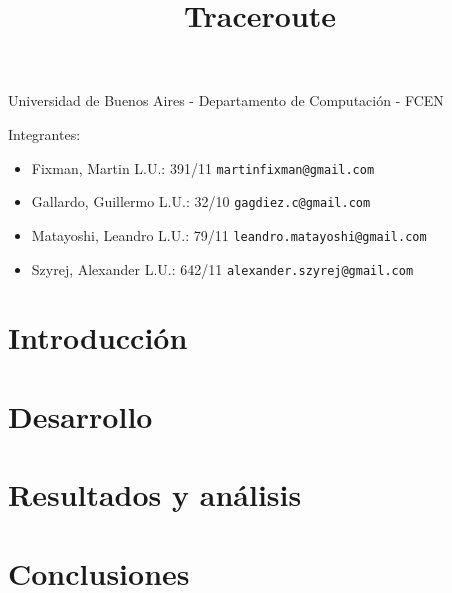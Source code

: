 \documentclass[a4paper,11pt]{article}
\title{Traceroute}
\begin{document}
\maketitle

\begin{center}
	Universidad de Buenos Aires - Departamento de Computaci\'on - FCEN
\end{center}

\vspace{2cm}
Integrantes:

\begin{itemize}
	\item Fixman, Martin L.U.: 391/11 \verb+martinfixman@gmail.com+
	\item Gallardo, Guillermo L.U.: 32/10 \verb+gagdiez.c@gmail.com+
	\item Matayoshi, Leandro L.U.: 79/11 \verb+leandro.matayoshi@gmail.com+
	\item Szyrej, Alexander L.U.: 642/11 \verb+alexander.szyrej@gmail.com+
\end{itemize}

\newpage

\tableofcontents

\newpage

\section{Introducci\'on}



\section{Desarrollo}



\clearpage

\section{Resultados y an\'alisis}

%

\section{Conclusiones}

%
\end{document}
